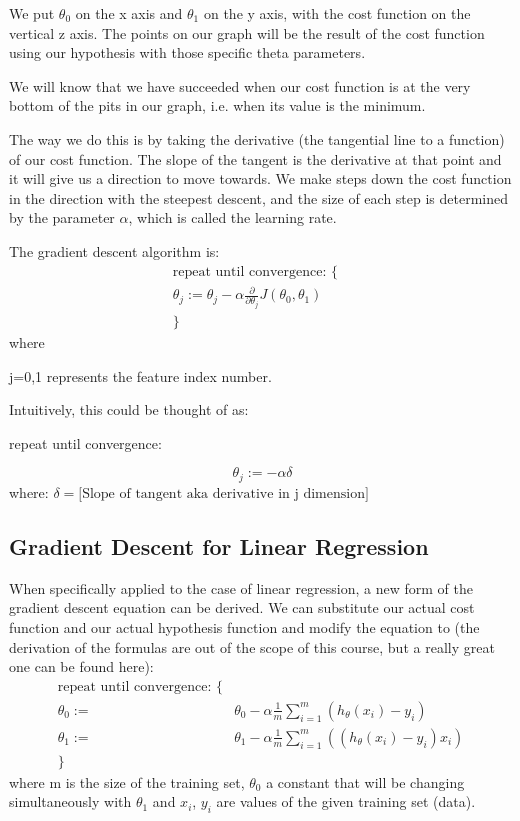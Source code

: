 We put $\theta_0$ on the x axis and $\theta_1$ on the y axis, with the cost function on the vertical z axis. The points on our graph will be the result of the cost function using our hypothesis with those specific theta parameters.

We will know that we have succeeded when our cost function is at the very bottom of the pits in our graph, i.e. when its value is the minimum.

The way we do this is by taking the derivative (the tangential line to a function) of our cost function. The slope of the tangent is the derivative at that point and it will give us a direction to move towards. We make steps down the cost function in the direction with the steepest descent, and the size of each step is determined by the parameter $\alpha$, which is called the learning rate.

The gradient descent algorithm is:
\begin{align*}
  \text{repeat until convergence: } \lbrace & \\
\theta_j := \theta_j - \alpha \frac{\partial}{\partial \theta_j} J(\theta_0, \theta_1)
  \\
  \rbrace &
\end{align*}
where

j=0,1 represents the feature index number.

Intuitively, this could be thought of as:

repeat until convergence:

\[\
\theta_j := -\alpha \delta
\]
where: $\delta = \text{[Slope of tangent aka derivative in j dimension]}$
\subsection*{Gradient Descent for Linear Regression}
When specifically applied to the case of linear regression, a new form of the gradient descent equation can be derived. We can substitute our actual cost function and our actual hypothesis function and modify the equation to (the derivation of the formulas are out of the scope of this course, but a really great one can be found here):
\begin{align*}
  \text{repeat until convergence: } \lbrace & \\
  \theta_0 := & \theta_0 - \alpha \frac{1}{m} \sum\limits_{i=1}^{m}(h_\theta(x_{i}) - y_{i}) \\
  \theta_1 := & \theta_1 - \alpha \frac{1}{m} \sum\limits_{i=1}^{m}\left((h_\theta(x_{i}) - y_{i}) x_{i}\right) \\
  \rbrace &
\end{align*}
where m is the size of the training set, $\theta_0$ a constant that will be changing simultaneously with $\theta_1$ and $x_{i}$, $y_{i}$ are values of the given training set (data).

